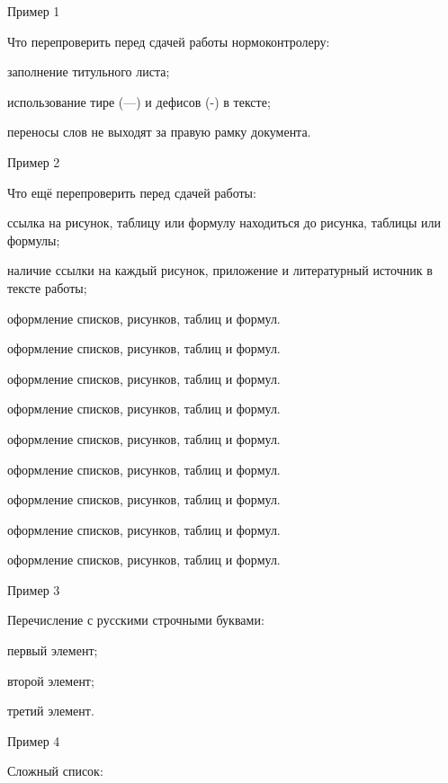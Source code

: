 \documentclass{report}
\begin{document}
\noindent Пример 1

\noindent Что перепроверить перед сдачей работы нормоконтролеру:
\begin{enummarker}
\item заполнение титульного листа;
\item использование тире (---) и дефисов (-) в тексте;
\item переносы слов не выходят за правую рамку документа. 
\end{enummarker}

\noindent Пример 2

\noindent Что ещё перепроверить перед сдачей работы:
\begin{enumarabic}
  \item ссылка на рисунок, таблицу или формулу находиться до рисунка, таблицы или формулы;
  \item наличие ссылки на каждый рисунок, приложение и литературный источник в тексте работы;
  \item оформление списков, рисунков, таблиц и формул.
  \item оформление списков, рисунков, таблиц и формул.
  \item оформление списков, рисунков, таблиц и формул.
  \item оформление списков, рисунков, таблиц и формул.
  \item оформление списков, рисунков, таблиц и формул.
  \item оформление списков, рисунков, таблиц и формул.
  \item оформление списков, рисунков, таблиц и формул.
  \item оформление списков, рисунков, таблиц и формул.
  \item оформление списков, рисунков, таблиц и формул.
\end{enumarabic}

\hfill\break %
\hfill\break
\hfill\break

\noindent Пример 3

\noindent Перечисление с русскими строчными буквами:
\begin{enumasbuk}
  \item первый элемент;
  \item второй элемент;
  \item третий элемент.
\end{enumasbuk}

\noindent Пример 4

\noindent Сложный список:
\end{document}
